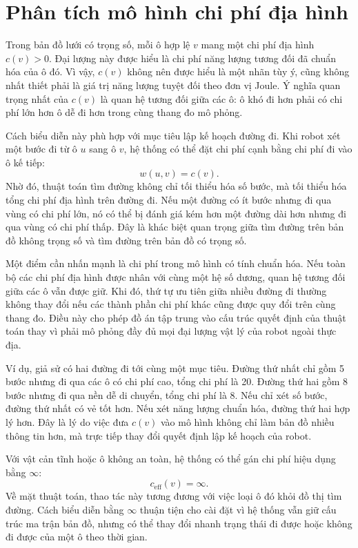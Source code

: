 \documentclass[../DoAn.tex]{subfiles}
\begin{document}
\section{Phân tích mô hình chi phí địa hình}

Trong bản đồ lưới có trọng số, mỗi ô hợp lệ $v$ mang một chi phí địa hình $c(v)>0$. Đại lượng này được hiểu là chi phí năng lượng tương đối đã chuẩn hóa của ô đó. Vì vậy, $c(v)$ không nên được hiểu là một nhãn tùy ý, cũng không nhất thiết phải là giá trị năng lượng tuyệt đối theo đơn vị Joule. Ý nghĩa quan trọng nhất của $c(v)$ là quan hệ tương đối giữa các ô: ô khó đi hơn phải có chi phí lớn hơn ô dễ đi hơn trong cùng thang đo mô phỏng.

Cách biểu diễn này phù hợp với mục tiêu lập kế hoạch đường đi. Khi robot xét một bước đi từ ô $u$ sang ô $v$, hệ thống có thể đặt chi phí cạnh bằng chi phí đi vào ô kế tiếp:
\begin{equation}
w(u,v)=c(v).
\end{equation}
Nhờ đó, thuật toán tìm đường không chỉ tối thiểu hóa số bước, mà tối thiểu hóa tổng chi phí địa hình trên đường đi. Nếu một đường có ít bước nhưng đi qua vùng có chi phí lớn, nó có thể bị đánh giá kém hơn một đường dài hơn nhưng đi qua vùng có chi phí thấp. Đây là khác biệt quan trọng giữa tìm đường trên bản đồ không trọng số và tìm đường trên bản đồ có trọng số.

Một điểm cần nhấn mạnh là chi phí trong mô hình có tính chuẩn hóa. Nếu toàn bộ các chi phí địa hình được nhân với cùng một hệ số dương, quan hệ tương đối giữa các ô vẫn được giữ. Khi đó, thứ tự ưu tiên giữa nhiều đường đi thường không thay đổi nếu các thành phần chi phí khác cũng được quy đổi trên cùng thang đo. Điều này cho phép đồ án tập trung vào cấu trúc quyết định của thuật toán thay vì phải mô phỏng đầy đủ mọi đại lượng vật lý của robot ngoài thực địa.

Ví dụ, giả sử có hai đường đi tới cùng một mục tiêu. Đường thứ nhất chỉ gồm 5 bước nhưng đi qua các ô có chi phí cao, tổng chi phí là 20. Đường thứ hai gồm 8 bước nhưng đi qua nền dễ di chuyển, tổng chi phí là 8. Nếu chỉ xét số bước, đường thứ nhất có vẻ tốt hơn. Nếu xét năng lượng chuẩn hóa, đường thứ hai hợp lý hơn. Đây là lý do việc đưa $c(v)$ vào mô hình không chỉ làm bản đồ nhiều thông tin hơn, mà trực tiếp thay đổi quyết định lập kế hoạch của robot.

Với vật cản tĩnh hoặc ô không an toàn, hệ thống có thể gán chi phí hiệu dụng bằng $\infty$:
\begin{equation}
c_{\text{eff}}(v)=\infty.
\end{equation}
Về mặt thuật toán, thao tác này tương đương với việc loại ô đó khỏi đồ thị tìm đường. Cách biểu diễn bằng $\infty$ thuận tiện cho cài đặt vì hệ thống vẫn giữ cấu trúc ma trận bản đồ, nhưng có thể thay đổi nhanh trạng thái đi được hoặc không đi được của một ô theo thời gian.
\end{document}
